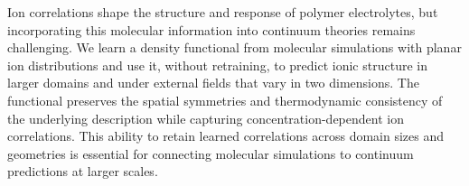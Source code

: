 Ion correlations shape the structure and response of polymer electrolytes, but incorporating this molecular information into continuum theories remains challenging. We learn a density functional from molecular simulations with planar ion distributions and use it, without retraining, to predict ionic structure in larger domains and under external fields that vary in two dimensions. The functional preserves the spatial symmetries and thermodynamic consistency of the underlying description while capturing concentration-dependent ion correlations. This ability to retain learned correlations across domain sizes and geometries is essential for connecting molecular simulations to continuum predictions at larger scales.
